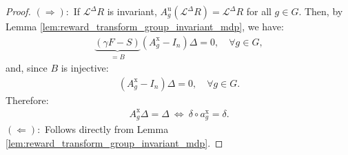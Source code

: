 \documentclass[10pt,leqno]{amsart}
\newcommand{\repr}[1]{a^{#1}}
\newcommand{\reprarg}[2]{\repr{#1}_{#2}}
\newcommand{\Cost}{R}
\newcommand{\F}{F}
\newcommand{\disc}{\gamma}
\newcommand{\Proj}{S}
\newcommand{\B}{B}
\begin{document}
\begin{proof}
    $(\Rightarrow):$ If $\mathcal{L}^\Delta\Cost$ is invariant, $A_g^{\mathrm{u}}(\mathcal{L}^\Delta\Cost) = \mathcal{L}^\Delta\Cost$ for all $g \in G$. Then, by Lemma \ref{lem:reward_transform_group_invariant_mdp}, we have:
    \begin{align*}
        \underbrace{\left( \disc \F - \Proj \right)}_{= \B}\left( A_g^{\mathrm{x}} - I_n \right)\Delta = 0, \quad \forall g \in G,
    \end{align*}
    and, since $\B$ is injective:
    \begin{align*}
        (A_g^{\mathrm{x}} - I_n)\Delta = 0, \quad \forall g \in G.
    \end{align*}
    Therefore:
    \begin{align*}
        A_g^{\mathrm{x}}\Delta = \Delta ~\Longleftrightarrow~ \delta \circ \reprarg{\mathrm{x}}{g} = \delta.
    \end{align*}
    $(\Leftarrow):$ Follows directly from Lemma \ref{lem:reward_transform_group_invariant_mdp}.
\end{proof} %
\end{document}
